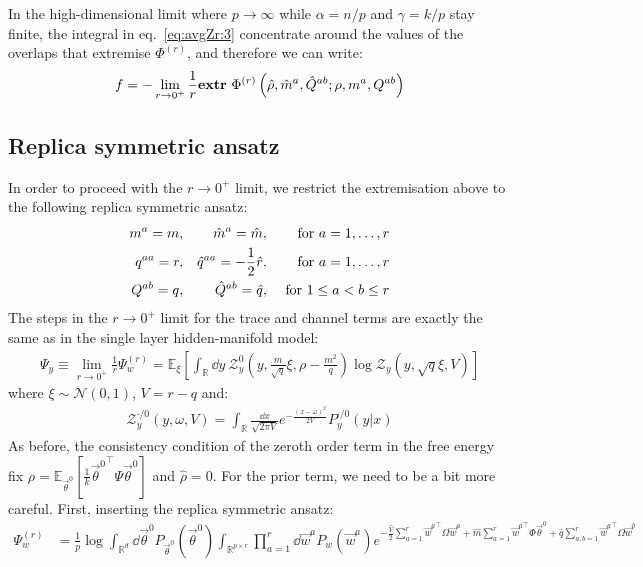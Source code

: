 \documentclass[11pt]{article}
\numberwithin{equation}{section}
\begin{document}
In the high-dimensional limit where $p\to\infty$ while $\alpha = n/p$ and $\gamma = k/p$ stay finite, the integral in eq.~\eqref{eq:avgZr:3} concentrate around the values of the overlaps that extremise $\Phi^{(r)}$, and therefore we can write:
\begin{align}
f = -\lim\limits_{r\to 0^{+}}\frac{1}{r}\textrm{\textbf{extr}}~ \Phi^{(r)}\left(\hat{\rho},\hat{m}^{a},\hat{Q}^{ab};\rho,m^{a},Q^{ab}\right)
\end{align}
\subsection*{Replica symmetric ansatz}
In order to proceed with the $r\to 0^{+}$ limit, we restrict the extremisation above to the following replica symmetric ansatz:
\begin{align}
m^{a} = m, && \hat{m}^{a} = \hat{m}, &&\text{ for } a=1,\dots, r	\notag\\
q^{aa} = r, && \hat{q}^{aa} = -\frac{1}{2}\hat{r}, &&\text{ for } a=1,\dots, r	\notag\\
Q^{ab} = q, && \hat{Q}^{ab} = \hat{q}, &&\text{ for } 1\leq a<b\leq r
\end{align}
The steps in the $r\to 0^{+}$ limit for the trace and channel terms are exactly the same as in the single layer hidden-manifold model:
\begin{align}
\Psi_{y}\equiv\lim\limits_{r\to 0^{+}}\frac{1}{r}\Psi^{(r)}_{w} = \mathbb{E}_{\xi}\left[\int_{\mathbb{R}}\dd y~\mathcal{Z}_{y}^{0}\left(y,\frac{m}{\sqrt{q}}\xi, \rho-\frac{m^2}{q}\right)\log\mathcal{Z}_{y}(y,\sqrt{q}\xi,V)\right]
\end{align}
\noindent where $\xi\sim\mathcal{N}(0,1)$, $V=r-q$ and:
\begin{align}
\mathcal{Z}_{y}^{\cdot/0}(y,\omega,V) = \int_{\mathbb{R}}\frac{\dd x}{\sqrt{2\pi V}}e^{-\frac{(x-\omega)^2}{2V}}P^{\cdot/0}_{y}(y|x)	
\end{align}
As before, the consistency condition of the zeroth order term in the free energy fix $\rho = \mathbb{E}_{\vec{\theta}^{0}}\left[\frac{1}{k}{\vec{\theta}^{0}}^{\top}\Psi\vec{\theta}^{0}\right]$ and $\hat{\rho} = 0$. For the prior term, we need to be a bit more careful. First, inserting the replica symmetric ansatz:
\begin{align}
\Psi_{w}^{(r)} &= \frac{1}{p}\log\int_{\mathbb{R}^{d}}\dd\vec{\theta}^{0}P_{\vec{\theta}^{0}}\left(\vec{\theta}^{0}\right)\int_{\mathbb{R}^{p\times r}}\prod\limits_{a=1}^{r}\dd\vec{w}^{a}P_{w}\left(\vec{w}^{a}\right) e^{-\frac{\hat{V}}{2}\sum\limits_{a=1}^{r}{\vec{w}^{a}}^{\top}\Omega\vec{w}^{a}+\hat{m}\sum\limits_{a=1}^{r}{\vec{w}^{a}}^{\top}\Phi\vec{\theta}^{0}+\hat{q}\sum\limits_{a,b=1}^{r}{\vec{w}^{a}}^{\top}\Omega\vec{w}^{b}}
\end{align}
\end{document}
